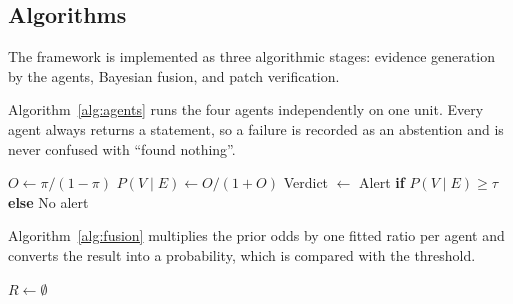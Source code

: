 \documentclass[conference]{IEEEtran}
\begin{document}
\subsection{Algorithms}

The framework is implemented as three algorithmic stages: evidence
generation by the agents, Bayesian fusion, and patch verification.

\begin{algorithm}[t]
\small
\caption{Evidence Generation for One Unit}
\label{alg:agents}
\;
\end{algorithm}

Algorithm~\ref{alg:agents} runs the four agents independently on one unit.
Every agent always returns a statement, so a failure is recorded as an
abstention and is never confused with ``found nothing''.

\begin{algorithm}[t]
\small
\caption{Bayesian Fusion and Alert Decision}
\label{alg:fusion}
$O\gets\pi/(1-\pi)$\;
$P(V\mid E)\gets O/(1+O)$\;
Verdict $\gets$ Alert \textbf{if} $P(V\mid E)\ge\tau$ \textbf{else} No alert\;
\;
\end{algorithm}

Algorithm~\ref{alg:fusion} multiplies the prior odds by one fitted ratio
per agent and converts the result into a probability, which is compared
with the threshold.

\begin{algorithm}[t]
\small
\caption{Patch Drafting and Verification}
\label{alg:patch}
$R\gets\emptyset$ 
\;
\end{algorithm}
\end{document}
